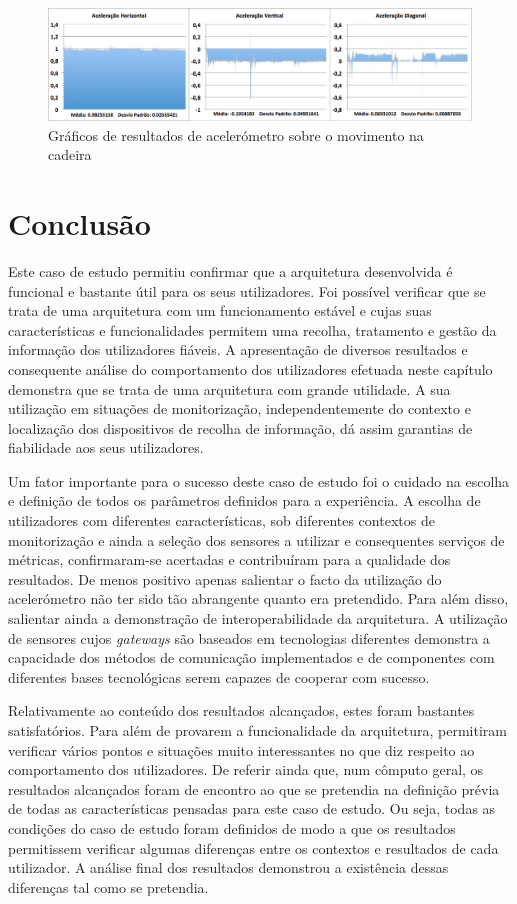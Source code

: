  \begin{figure}[htb]
   \centering
   \includegraphics[scale=0.35]{Images/aceleracao1.png}
   \caption{Gráficos de resultados de acelerómetro sobre o movimento na cadeira}
\end{figure}



\section{Conclusão}

Este caso de estudo permitiu confirmar que a arquitetura desenvolvida é funcional e bastante útil para os seus utilizadores. Foi possível verificar que se trata de uma arquitetura com um funcionamento estável e cujas suas características e funcionalidades permitem uma recolha, tratamento e gestão da informação dos utilizadores fiáveis. A apresentação de diversos resultados e consequente análise do comportamento dos utilizadores efetuada neste capítulo demonstra que se trata de uma arquitetura com grande utilidade. A sua utilização em situações de monitorização, independentemente do contexto e localização dos dispositivos de recolha de informação, dá assim garantias de fiabilidade aos seus utilizadores.

Um fator importante para o sucesso deste caso de estudo foi o cuidado na escolha e definição de todos os parâmetros definidos para a experiência. A escolha de utilizadores com diferentes características, sob diferentes contextos de monitorização e ainda a seleção dos sensores a utilizar e consequentes serviços de métricas, confirmaram-se acertadas e contribuíram para a qualidade dos resultados. De menos positivo apenas salientar o facto da utilização do acelerómetro não ter sido tão abrangente quanto era pretendido. Para além disso, salientar ainda a demonstração de interoperabilidade da arquitetura. A utilização de sensores cujos \textit{gateways} são baseados em tecnologias diferentes demonstra a capacidade dos métodos de comunicação implementados e de componentes com diferentes bases tecnológicas serem capazes de cooperar com sucesso.

Relativamente ao conteúdo dos resultados alcançados, estes foram bastantes satisfatórios. Para além de provarem a funcionalidade da arquitetura, permitiram verificar vários pontos e situações muito interessantes no que diz respeito ao comportamento dos utilizadores. De referir ainda que, num cômputo geral, os resultados alcançados foram de encontro ao que se pretendia na definição prévia de todas as características pensadas para este caso de estudo. Ou seja, todas as condições do caso de estudo foram definidos de modo a que os resultados permitissem verificar algumas diferenças entre os contextos e resultados de cada utilizador. A análise final dos resultados demonstrou a existência dessas diferenças tal como se pretendia.

